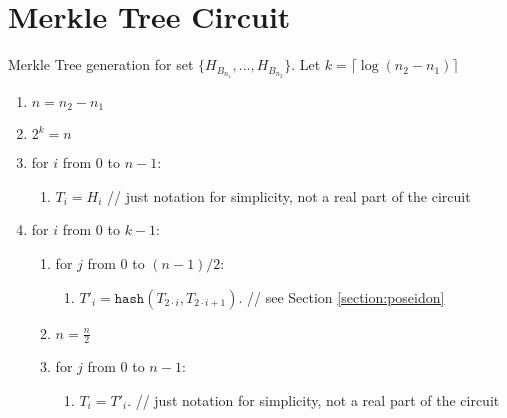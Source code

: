 \section{Merkle Tree Circuit}
\label{section:merkle}

Merkle Tree generation for set $\{H_{B_{n_1}}, ..., H_{B_{n_2}}\}$.
Let $k = \lceil \log(n_2 - n_1) \rceil$

\begin{enumerate}
	\item $n = n_2 - n_1$
	\item $2^k = n$
	\item for $i$ from $0$ to $n - 1$:
	\begin{enumerate}
		\item $T_i = H_i$ // just notation for simplicity, not a real part of the circuit
	\end{enumerate}
	\item for $i$ from $0$ to $k - 1$:
	\begin{enumerate}
		\item for $j$ from $0$ to $(n - 1) / 2$:
		\begin{enumerate}
			\item $T'_i = \texttt{hash}(T_{2 \cdot  i}, T_{2 \cdot i + 1})$. // see Section \ref{section:poseidon}
		\end{enumerate}
		\item $n = \frac{n}{2}$
		\item for $j$ from $0$ to $n - 1$:
		\begin{enumerate}
			\item $T_i = T'_i$. // just notation for simplicity, not a real part of the circuit
		\end{enumerate}
	\end{enumerate}
\end{enumerate}